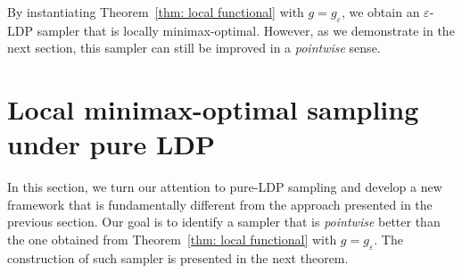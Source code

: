 \documentclass[accepted]{article}
\theoremstyle{plain} %
\theoremstyle{definition}
\theoremstyle{remark}
\newcommand{\eps}{\varepsilon}
\newcommand{\bQ}{\mathbf{Q}}
\begin{document}
By instantiating Theorem~\ref{thm: local functional} with $g = g_\eps$, we obtain an $\eps$-LDP sampler that is locally minimax-optimal. However, as we demonstrate in the next section, this sampler can still be improved in a \textit{pointwise} sense.







\vspace{0.1cm}
\section{Local minimax-optimal sampling under pure LDP}\label{sec: local pure}
\vspace{0.1cm}

In this section, we turn our attention to pure-LDP sampling and develop a new framework that is fundamentally different from the approach presented in the previous section. Our goal is to identify a sampler that is \textit{pointwise} better than the one obtained from Theorem~\ref{thm: local functional} with $g = g_\eps$.  The construction of such sampler is presented in the next theorem.



\end{document}
